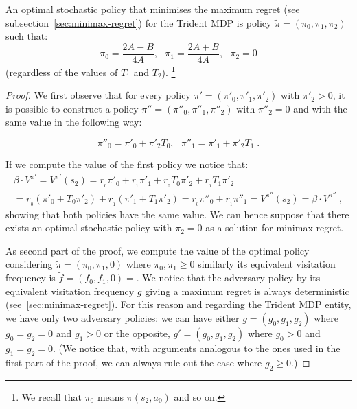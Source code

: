 \begin{proposition}\label{theorem:opt_stoc}
An optimal stochastic policy that minimises the maximum regret (see subsection~\ref{sec:minimax-regret}) for the Trident MDP is policy $\tilde{\pi} = (\pi_0, \pi_1, \pi_2)$ such that:
$$\pi_{0}=\dfrac{2A - B}{4A},~~~\pi_{1}=\dfrac{2A + B}{4A}, ~~~\pi_2 = 0$$
(regardless of the values of $T_1$ and $T_2$). \footnote{We recall that $\pi_0$ means $\pi(s_2, a_0)$ and so on.}
\end{proposition}
\begin{proof}
We first observe that for every policy $\pi' = (\pi'_0, \pi'_1, \pi'_2)$ with $\pi'_2 > 0$, it is possible to construct a policy $\pi'' = (\pi''_0, \pi''_1, \pi''_2)$ with $\pi''_2 = 0$ and with the same value in the following way:

$$\pi''_0 = \pi'_0 + \pi'_2 T_0, ~~~ \pi''_1 = \pi'_1 + \pi'_2 T_1\;.$$

If we compute the value of the first policy we notice that:
\begin{align*}
\beta \cdot V^{\pi'} = V^{\pi'}(s_2) =
r_{_0} \pi'_0 + r_{_1}\pi'_1 + r_{_0} T_0 \pi'_2 + r_{_1} T_1 \pi'_2 \\
= r_{_0} (\pi'_0 + T_0 \pi'_2) + r_{_1} (\pi'_1 + T_1 \pi'_2)
= r_{_0} \pi''_0 + r_{_1}\pi''_1 = V^{\pi''}(s_2) =\beta \cdot V^{\pi''}\;,
\end{align*}
showing that both policies have the same value.
We can hence suppose that there exists an optimal stochastic policy with $\pi_2 =0$ as a solution for minimax regret. 

As second part of the proof, we compute the value of the optimal policy considering $\tilde{\pi} = (\pi_0, \pi_1, 0)$ where $\pi_0, \pi_1 \geq 0$ similarly its equivalent visitation frequency is $\tilde{f} = (f_0, f_1, 0) =$. 
We notice that the adversary policy by its equivalent visitation frequency $g$ giving a maximum regret is always deterministic (see~\ref{sec:minimax-regret}). For this reason and regarding the Trident MDP entity, we have only two adversary policies: we can have either $g = (g_0, g_1, g_2)$ where $g_0 = g_2=0$ and $g_1 > 0$ or the opposite, $g' = (g_0, g_1, g_2)$ where $g_0>0$ and $g_1 = g_2 = 0$. (We notice that, with arguments analogous to the ones used in the first part of the proof, we can always rule out the case where $g_2 \geq 0$.)


\end{proof}
